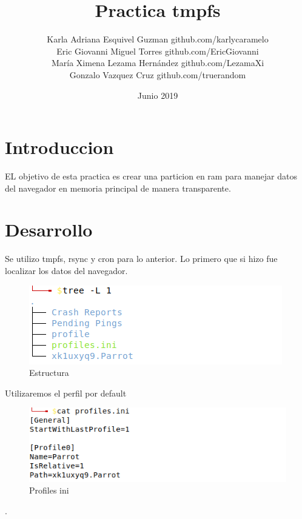 \documentclass{article}
\title{Practica tmpfs}
\author{
    Karla Adriana Esquivel Guzman github.com/karlycaramelo \\
    Eric Giovanni Miguel Torres github.com/EricGiovanni \\
    María Ximena Lezama Hernández github.com/LezamaXi \\
    Gonzalo Vazquez Cruz github.com/truerandom \\
}
\date{Junio 2019}
\begin{document}
\maketitle

\section{Introduccion}
EL objetivo de esta practica es crear una particion en ram para manejar datos del navegador en memoria principal de manera transparente.

\section{Desarrollo}
Se utilizo  tmpfs, rsync y cron para lo anterior.
Lo primero que si hizo fue localizar los datos del navegador.
\begin{figure}[h!]
\centering
\includegraphics[scale=1]{imgs/estructura.png}
\caption{Estructura}
\label{fig:universe}
\end{figure}

Utilizaremos el perfil por default \\ 
\begin{figure}[h!]
\centering
\includegraphics[scale=0.8]{imgs/profilesini.png}
\caption{Profiles ini}
\label{fig:universe}
\end{figure}
. \\ \\ \\ \\ \\ \\ \\ \\ \\ 
\end{document}
